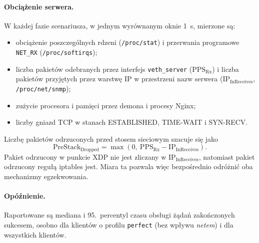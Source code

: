 \documentclass[a4paper,12pt]{article}
\begin{document}
\paragraph{Obciążenie serwera.} W każdej fazie scenariusza, w jednym wyrównanym oknie 1~s, mierzone są:
\begin{itemize}
    \item obciążenie poszczególnych rdzeni (\texttt{/proc/stat}) i przerwania programowe \texttt{NET\_RX} (\texttt{/proc/softirqs});
    \item liczba pakietów odebranych przez interfejs \texttt{veth\_server} ($\mathrm{PPS}_{\mathrm{Rx}}$) i liczba pakietów przyjętych przez warstwę IP w przestrzeni nazw serwera ($\mathrm{IP}_{\mathrm{InReceives}}$, \texttt{/proc/net/snmp});
    \item zużycie procesora i pamięci przez demona i procesy Nginx;
    \item liczby gniazd TCP w stanach ESTABLISHED, TIME-WAIT i SYN-RECV.
\end{itemize}
Liczbę pakietów odrzuconych przed stosem sieciowym szacuje się jako
\begin{equation}
\mathrm{PreStack}_{\mathrm{Dropped}} = \max\left(0,\ \mathrm{PPS}_{\mathrm{Rx}} - \mathrm{IP}_{\mathrm{InReceives}}\right).
\end{equation}
Pakiet odrzucony w punkcie XDP nie jest zliczany w $\mathrm{IP}_{\mathrm{InReceives}}$, natomiast pakiet odrzucony regułą iptables jest. Miara ta pozwala więc bezpośrednio odróżnić oba mechanizmy egzekwowania.

\paragraph{Opóźnienie.} Raportowane są mediana i 95.~percentyl czasu obsługi żądań zakończonych sukcesem, osobno dla klientów o profilu \texttt{perfect} (bez wpływu \textit{netem}) i dla wszystkich klientów.
\end{document}
